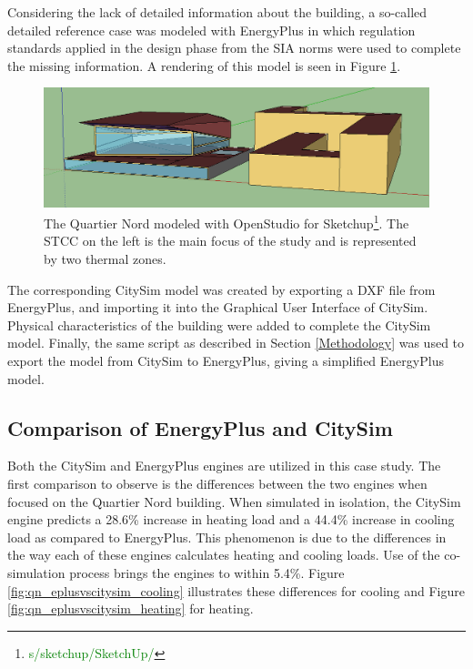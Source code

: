 \documentclass{tBPS2e}
\theoremstyle{plain}
\theoremstyle{definition}
\theoremstyle{remark}
\newcommand{\noteDT}[1]{\footnote{\textcolor{green}{#1}}}
\begin{document}
Considering the lack of detailed information about the building, a so-called
detailed reference case was modeled with EnergyPlus \citep{Mauree:2015to} in
which regulation standards applied in the design phase from the SIA norms were
used to complete the missing information. A rendering of this model is seen in
Figure \ref{fig:model_yang}.

\begin{figure}[H]
\centering
\includegraphics[width=\textwidth]{figures/model_yang}
\caption{The Quartier Nord modeled with OpenStudio for
Sketchup\noteDT{s/sketchup/SketchUp/}. The STCC on the left is the main focus
of the study and is represented by two thermal zones.}
\label{fig:model_yang}
\end{figure}

The corresponding CitySim model was created by exporting a DXF file from
EnergyPlus, and importing it into the Graphical User Interface of CitySim.
Physical characteristics of the building were added to complete the CitySim
model. Finally, the same script as described in Section \ref{Methodology} was
used to export the model from CitySim to EnergyPlus, giving a simplified
EnergyPlus model.\\

\subsection{Comparison of EnergyPlus and CitySim}

Both the CitySim and EnergyPlus engines are utilized in this case study. The
first comparison to observe is the differences between the two engines when
focused on the Quartier Nord building. When simulated in isolation, the
CitySim engine predicts a 28.6\% increase in heating load and a 44.4\%
increase in cooling load as compared to EnergyPlus. This phenomenon is due to
the differences in the way each of these engines calculates heating and
cooling loads. Use of the co-simulation process brings the engines to within
5.4\%. Figure \ref{fig:qn_eplusvscitysim_cooling} illustrates these
differences for cooling and Figure \ref{fig:qn_eplusvscitysim_heating} for
heating.
\end{document}
